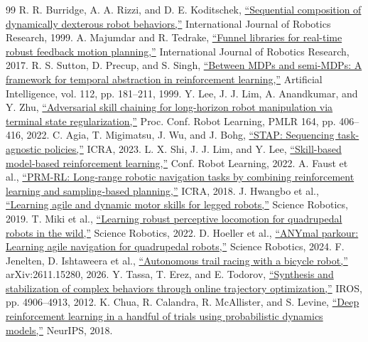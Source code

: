 \begin{thebibliography}{99}
 R. R. Burridge, A. A. Rizzi, and D. E. Koditschek, \href{https://doi.org/10.1177/02783649922066385}{``Sequential composition of dynamically dexterous robot behaviors,''} International Journal of Robotics Research, 1999.
 A. Majumdar and R. Tedrake, \href{https://arxiv.org/abs/1601.04037}{``Funnel libraries for real-time robust feedback motion planning,''} International Journal of Robotics Research, 2017.
 R. S. Sutton, D. Precup, and S. Singh, \href{https://doi.org/10.1016/S0004-3702(99)00052-1}{``Between MDPs and semi-MDPs: A framework for temporal abstraction in reinforcement learning,''} Artificial Intelligence, vol. 112, pp. 181--211, 1999.
 Y. Lee, J. J. Lim, A. Anandkumar, and Y. Zhu, \href{https://proceedings.mlr.press/v164/lee22a.html}{``Adversarial skill chaining for long-horizon robot manipulation via terminal state regularization,''} Proc. Conf. Robot Learning, PMLR 164, pp. 406--416, 2022.
 C. Agia, T. Migimatsu, J. Wu, and J. Bohg, \href{https://arxiv.org/abs/2210.12250}{``STAP: Sequencing task-agnostic policies,''} ICRA, 2023.
 L. X. Shi, J. J. Lim, and Y. Lee, \href{https://arxiv.org/abs/2207.07560}{``Skill-based model-based reinforcement learning,''} Conf. Robot Learning, 2022.
 A. Faust et al., \href{https://arxiv.org/abs/1710.03937}{``PRM-RL: Long-range robotic navigation tasks by combining reinforcement learning and sampling-based planning,''} ICRA, 2018.
 J. Hwangbo et al., \href{https://doi.org/10.1126/scirobotics.aau5872}{``Learning agile and dynamic motor skills for legged robots,''} Science Robotics, 2019.
 T. Miki et al., \href{https://doi.org/10.1126/scirobotics.abk2822}{``Learning robust perceptive locomotion for quadrupedal robots in the wild,''} Science Robotics, 2022.
 D. Hoeller et al., \href{https://pubmed.ncbi.nlm.nih.gov/38478592/}{``ANYmal parkour: Learning agile navigation for quadrupedal robots,''} Science Robotics, 2024.
 F. Jenelten, D. Ishtaweera et al., \href{https://arxiv.org/abs/2611.15280}{``Autonomous trail racing with a bicycle robot,''} arXiv:2611.15280, 2026.
 Y. Tassa, T. Erez, and E. Todorov, \href{https://doi.org/10.1109/IROS.2012.6386025}{``Synthesis and stabilization of complex behaviors through online trajectory optimization,''} IROS, pp. 4906--4913, 2012.
 K. Chua, R. Calandra, R. McAllister, and S. Levine, \href{https://arxiv.org/abs/1805.12114}{``Deep reinforcement learning in a handful of trials using probabilistic dynamics models,''} NeurIPS, 2018.

\end{thebibliography}
